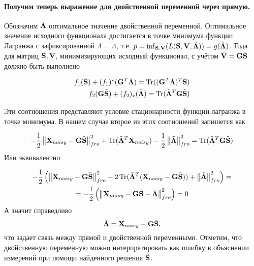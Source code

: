 \paragraph{Получим теперь выражение для двойственной переменной через прямую.}


Обозначим
$\tilde{\mathbf{\Lambda}}$ оптимальное значение двойственной переменной.
Оптимальное значение исходного функционала достигается в точке минимума
функции Лагранжа с зафиксированной $\Lambda = \tilde{\Lambda}$, т.е.
$ \tilde{p} = \inf_{\mathbf{S}, \mathbf{V}}(L(\mathbf{S}, \mathbf{V}, \tilde{\mathbf{\Lambda}})) =
g(\tilde{\mathbf{\Lambda}})$. Тода для матриц $\tilde{\mathbf{S}},
\tilde{\mathbf{V}}$, минимизирующих исходный функционал, с учётом $\tilde{\mathbf{V}} =
\mathbf{G}\tilde{\mathbf{S}}$ должно быть выполнено

\begin{align}
    f_1(\tilde{\mathbf{S}}) + (f_1)^{\star}(\mathbf{G}^T\tilde{\mathbf{\Lambda}}) = \operatorname*{Tr}((\mathbf{G}^T\tilde{\mathbf{\Lambda}})^T\tilde{\mathbf{S}}) \label{eq:dual_kkt_conditions_1}\\
    f_2(\mathbf{G}\tilde{\mathbf{S}}) + (f_2)_{\star}(\tilde{\mathbf{\Lambda}}) = \operatorname*{Tr}(\tilde{\mathbf{\Lambda}}^T\mathbf{G}\tilde{\mathbf{S}}) \label{eq:dual_kkt_conditions_2}
\end{align}

Эти соотношения представляют условие стационарности функции лагранжа в точке минимума.
В нашем случае второе из этих соотношений запишется как

\begin{equation*}
    - \frac{1}{2} \left\lVert\mathbf{X}_{noisy} - \mathbf{G}\tilde{\mathbf{S}}\right\rVert^2_{fro} + \operatorname*{Tr}({\tilde{\mathbf{\Lambda}}^T\mathbf{X}_{noisy}}) - \frac{1}{2}\left\lVert\tilde{\mathbf{\Lambda}}\right\rVert^2_{fro}=
    \operatorname*{Tr}(\tilde{\mathbf{\Lambda}}^T\mathbf{G}\tilde{\mathbf{S}})
\end{equation*}
Или эквивалентно

\begin{multline*}
    - \frac{1}{2}\left(\left\lVert\mathbf{X}_{noisy}-\mathbf{G}\tilde{\mathbf{S}}\right\rVert^2_{fro} -
        2\operatorname*{Tr}({\tilde{\mathbf{\Lambda}}^T(\mathbf{X}_{noisy}-\mathbf{G}\tilde{\mathbf{S}})}) +
    \left\lVert\tilde{\mathbf{\Lambda}}\right\rVert^2_{fro}\right) =\\
    =-\frac{1}{2}\left(\left\lVert\mathbf{X}_{noisy} - \mathbf{G}\tilde{\mathbf{S}} - \tilde{\mathbf{\Lambda}}\right\rVert^2_{fro}\right)
    =0
\end{multline*}
А значит справедливо
\begin{equation}
    \tilde{\mathbf{\Lambda}} = \mathbf{X}_{noisy} - \mathbf{G}\tilde{\mathbf{S}},
    \label{eq:dual_variable}
\end{equation}
что задает связь между прямой и двойственной переменными. Отметим, что двойственную
переменную можно интерпретировать как ошибку в объяснении измерений при помощи
найденного решения $\hat{\mathbf{S}}$.

